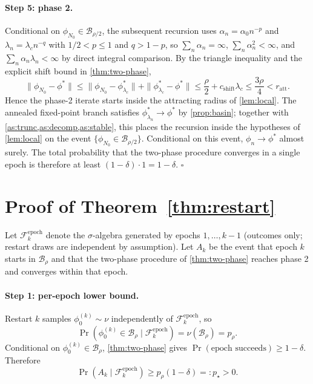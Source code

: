 \documentclass{nextgame2026} %
\newcommand{\B}{\mathcal{B}}
\newcommand{\F}{\mathcal{F}}
\begin{document}
\paragraph{Step 5: phase 2.}
Conditional on $\phi_{N_0}\in\B_{\rho/2}$, the subsequent recursion uses $\alpha_n=\alpha_0 n^{-p}$ and $\lambda_n=\lambda_c n^{-q}$ with $1/2<p\le 1$ and $q>1-p$, so $\sum_n\alpha_n=\infty$, $\sum_n\alpha_n^2<\infty$, and $\sum_n\alpha_n\lambda_n<\infty$ by direct integral comparison. By the triangle inequality and the explicit shift bound in \cref{thm:two-phase},
\[
\|\phi_{N_0}-\phi^\ast\|
\le
\|\phi_{N_0}-\phi^\ast_{\lambda_c}\|+\|\phi^\ast_{\lambda_c}-\phi^\ast\|
\le
\frac{\rho}{2}+c_{\mathrm{shift}}\lambda_c
\le
\frac{3\rho}{4}
<r_{\mathrm{att}}.
\]
Hence the phase-2 iterate starts inside the attracting radius of \cref{lem:local}. The annealed fixed-point branch satisfies $\phi^\ast_{\lambda_n}\to\phi^\ast$ by \cref{prop:basin}; together with \cref{as:trunc,as:decomp,as:stable}, this places the recursion inside the hypotheses of \cref{lem:local} on the event $\{\phi_{N_0}\in\B_{\rho/2}\}$. Conditional on this event, $\phi_n\to\phi^\ast$ almost surely. The total probability that the two-phase procedure converges in a single epoch is therefore at least $(1-\delta)\cdot 1=1-\delta$. $\square$

\section{Proof of Theorem~\ref{thm:restart}}\label{app:thm-restart}

Let $\F_k^{\mathrm{epoch}}$ denote the $\sigma$-algebra generated by epochs $1,\ldots,k-1$ (outcomes only; restart draws are independent by assumption). Let $A_k$ be the event that epoch $k$ starts in $\B_\rho$ and that the two-phase procedure of \cref{thm:two-phase} reaches phase 2 and converges within that epoch.

\paragraph{Step 1: per-epoch lower bound.}
Restart $k$ samples $\phi_0^{(k)}\sim\nu$ independently of $\F_k^{\mathrm{epoch}}$, so
\[
\Pr(\phi_0^{(k)}\in\B_\rho\mid\F_k^{\mathrm{epoch}})=\nu(\B_\rho)=p_\rho.
\]
Conditional on $\phi_0^{(k)}\in\B_\rho$, \cref{thm:two-phase} gives $\Pr(\text{epoch succeeds})\ge 1-\delta$. Therefore
\[
\Pr(A_k\mid\F_k^{\mathrm{epoch}})\ge p_\rho(1-\delta)=:p_\star>0.
\]
\end{document}
